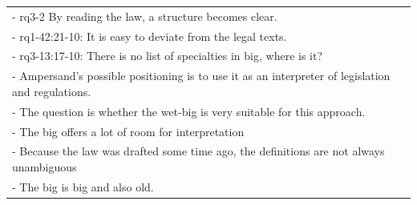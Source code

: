 \begin{xltabular}{\textwidth}{|X|}
-	 rq3-2 By reading the law, a structure becomes clear.	\\
-	 rq1-42:21-10: It is easy to deviate from the legal texts.	\\
-	 rq3-13:17-10: There is no list of specialties in \acrshort{big}, where is it?	\\
-	Ampersand's possible positioning is to use it as an interpreter of legislation and regulations. 	\\
-	The question is whether the wet-big is very suitable for this approach.	\\
-	The \acrshort{big} offers a lot of room for interpretation	\\
-	Because the law was drafted some time ago, the definitions are not always unambiguous	\\
-	The \acrshort{big} is big and also old.	\\
\end{xltabular}


